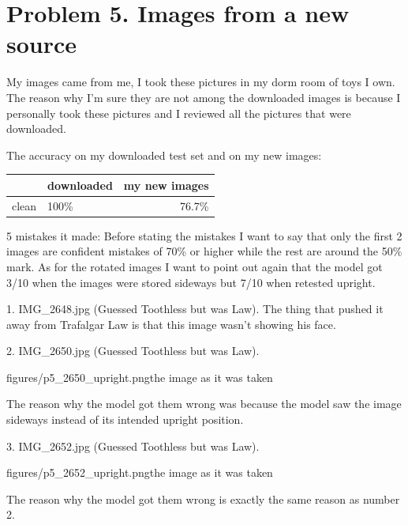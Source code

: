 \documentclass[11pt]{article}
\begin{document}
\section*{Problem 5. Images from a new source}

My images came from me, I took these pictures in my dorm room of toys I own.
The reason why I'm sure they are not among the downloaded images is because I
personally took these pictures and I reviewed all the pictures that were
downloaded.


The accuracy on my downloaded test set and on my new images:

\begin{center}\small
\begin{tabular}{llr}
\toprule
 & downloaded & my new images \\
\midrule
clean & 100\% & 76.7\% \\
\bottomrule
\end{tabular}
\end{center}

5 mistakes it made: Before stating the mistakes I want to say that only the
first 2 images are confident mistakes of 70\% or higher while the rest are
around the 50\% mark. As for the rotated images I want to point out again that
the model got 3/10 when the images were stored sideways but 7/10 when retested
upright.

1. IMG\_2648.jpg (Guessed Toothless but was Law). The thing that pushed it
away from Trafalgar Law is that this image wasn't showing his face.


2. IMG\_2650.jpg (Guessed Toothless but was Law).

           {figures/p5_2650_upright.png}{the image as it was taken}

The reason why the model got them wrong was because the model saw the image
sideways instead of its intended upright position.

3. IMG\_2652.jpg (Guessed Toothless but was Law).

           {figures/p5_2652_upright.png}{the image as it was taken}

The reason why the model got them wrong is exactly the same reason as number 2.
\end{document}
